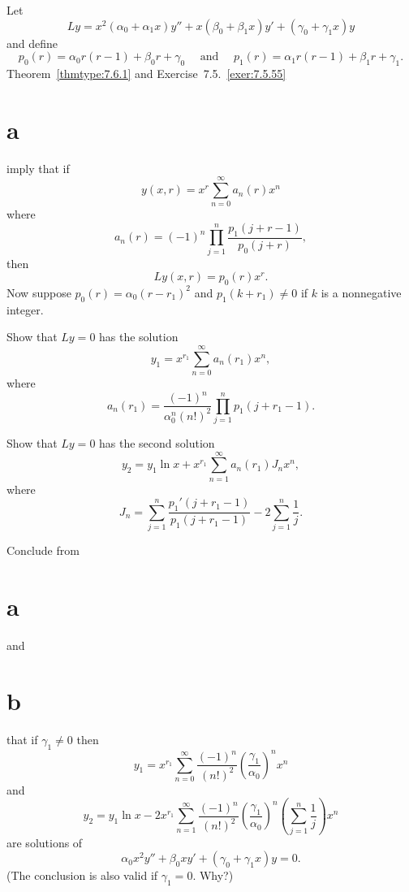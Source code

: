 \begin{exerciselist}
  \item\label{exer:7.6.54} Let
  \[
    Ly=x^{2}(\alpha_{0}+\alpha_{1}x)y''+x(\beta_{0}+\beta_{1}x)y'+(\gamma_{0}+\gamma_{1}x)y
  \]
  and define
  \[
    p_{0}(r)=\alpha_{0}r(r-1)+\beta_{0}r+\gamma_{0}\quad\mbox{ and }\quad p_{1}(r)=\alpha_{1}r(r-1)+\beta_{1}r+\gamma_{1}.
  \]
  Theorem~\ref{thmtype:7.6.1} and Exercise~7.5.~\hspace*{-3pt}\ref{exer:7.5.55}\part{a} imply that
  if
  \[
    y(x,r)=x^{r}\sum_{n=0}^{\infty}a_{n}(r)x^{n}
  \]
  where
  \[
    a_{n}(r)=(-1)^{n}\prod_{j=1}^{n}\frac{p_{1}(j+r-1)}{p_{0}(j+r)},
  \]
  then
  \[
    Ly(x,r)=p_{0}(r)x^{r}.
  \]
  Now suppose $p_{0}(r)=\alpha_{0}(r-r_{1})^{2}$ and $p_{1}(k+r_{1})\ne0$ if $k$ is a nonnegative
  integer.
  \begin{alist}
    \item %
    Show that $Ly=0$ has the solution
    \[
      y_{1}=x^{r_{1}}\sum_{n=0}^{\infty}a_{n}(r_{1})x^{n},
    \]
    where
    \[
      a_{n}(r_{1})=\frac{(-1)^{n}}{\alpha_{0}^{n}(n!)^{2}}\prod_{j=1}^{n}p_{1}(j+r_{1}-1).
    \]

    \item %
    Show that $Ly=0$ has the second solution
    \[
      y_{2}=y_{1}\ln x+x^{r_{1}}\sum_{n=1}^{\infty}a_{n}(r_{1})J_{n}x^{n},
    \]
    where
    \[
      J_{n}=\sum_{j=1}^{n}\frac{p_{1}'(j+r_{1}-1)}{p_{1}(j+r_{1}-1)}-2\sum_{j=1}^{n}\frac{1}{j}.
    \]

    \item %
    Conclude from \part{a} and \part{b} that if $\gamma_{1}\ne0$ then
    \[
      y_{1}=x^{r_{1}}\sum_{n=0}^{\infty}\frac{(-1)^{n}}{(n!)^{2}}\left(\frac{\gamma_{1}}{\alpha_{0}}\right)^{n}x^{n}
    \]
    and
    \[
      y_{2}=y_{1}\ln x-2x^{r_{1}}\sum_{n=1}^{\infty}\frac{(-1)^{n}}{(n!)^{2}}\left(\frac{\gamma_{1}}{\alpha_{0}}\right)^{n}\left(\sum_{j=1}^{n}\frac{1}{j}\right)x^{n}
    \]
    are solutions of
    \[
      \alpha_{0}x^{2}y''+\beta_{0}xy'+(\gamma_{0}+\gamma_{1}x)y=0.
    \]
    (The conclusion is also valid if $\gamma_{1}=0$. Why?)
  \end{alist}


\end{exerciselist}
